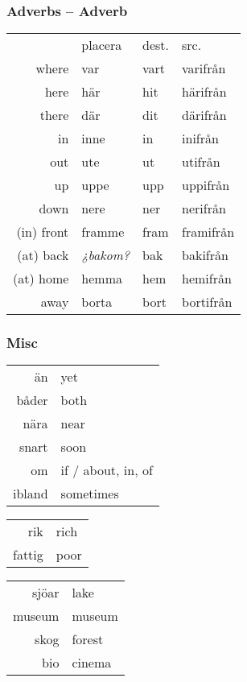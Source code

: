 \documentclass[14pt]{refcard} %
\begin{document}
\subsubsection{Adverbs -- Adverb}

\begin{tabular}{rlll}
            & placera & dest. & src. \\[1ex]
where       & var     & vart  & varifrån  \\[.5ex]
here        & här     & hit   & härifrån  \\
there       & där     & dit   & därifrån  \\[.5ex]
in          & inne    & in    & inifrån   \\
out         & ute     & ut    & utifrån   \\[.5ex]
up          & uppe    & upp   & uppifrån  \\
down        & nere    & ner   & nerifrån  \\[.5ex]
(in) front  & framme  & fram  & framifrån \\
(at) back   & \emph{¿bakom?} & bak   & bakifrån \\[.5ex]
(at) home   & hemma   & hem   & hemifrån  \\
away        & borta   & bort  & bortifrån \\[.5ex]
\end{tabular}


\subsubsection{Misc}

\begin{tabular}{rl}
än    & yet  \\
båder & both \\
nära  & near \\
snart & soon \\
om    & if / about, in, of \\
ibland & sometimes \\
\end{tabular}

\begin{tabular}{rl}
rik & rich \\
fattig & poor \\
\end{tabular}

\begin{tabular}{rl}
sjöar & lake \\
museum & museum \\
skog & forest \\
bio & cinema \\
\end{tabular}
\end{document}
